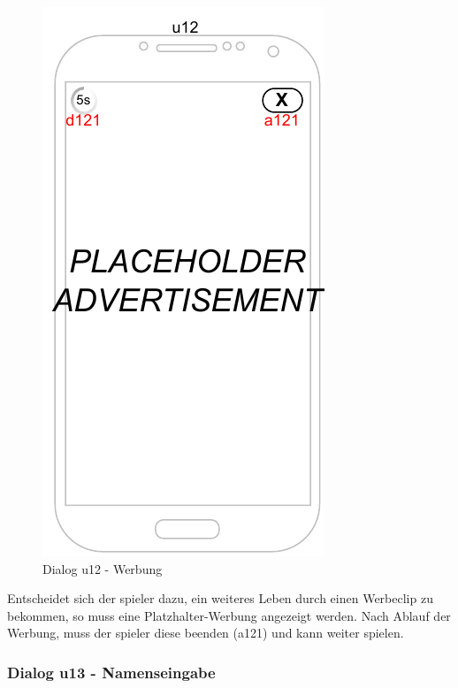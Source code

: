 \begin{figure}
    \begin{center}
    \includegraphics{diagramme/pdf/Mockup-u12.pdf}
    \end{center}
    \caption{Dialog u12 - Werbung}
\end{figure}

Entscheidet sich der \gls{spieler} dazu, ein weiteres Leben durch einen Werbeclip zu bekommen, so muss eine Platzhalter-Werbung angezeigt werden.
Nach Ablauf der Werbung, muss der \gls{spieler} diese beenden (a121) und kann weiter spielen.
\clearpage

\subsubsection{Dialog u13 - Namenseingabe}

